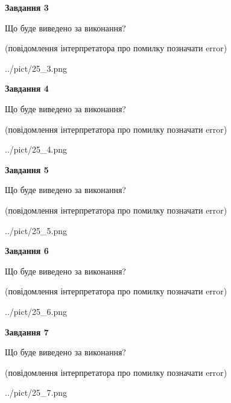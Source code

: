 \documentclass[12pt, ukrainian]{article}
\begin{document}
{\begin {large}
{\begin {center}\textbf{Завдання 3}\end {center}}\par
Що буде виведено за виконання?\par
 (повідомлення інтерпретатора про помилку позначати error)\par
\begin{center}
	{../pict/25_3.png}
\end{center}
\newpage

{\begin {center}\textbf{Завдання 4}\end {center}}\par
Що буде виведено за виконання?\par
 (повідомлення інтерпретатора про помилку позначати error)\par
\begin{center}
	{../pict/25_4.png}
\end{center}
\newpage

{\begin {center}\textbf{Завдання 5}\end {center}}\par
Що буде виведено за виконання?\par
 (повідомлення інтерпретатора про помилку позначати error)\par
\begin{center}
	{../pict/25_5.png}
\end{center}
\newpage

{\begin {center}\textbf{Завдання 6}\end {center}}\par
Що буде виведено за виконання?\par
 (повідомлення інтерпретатора про помилку позначати error)\par
\begin{center}
	{../pict/25_6.png}
\end{center}
\newpage

{\begin {center}\textbf{Завдання 7}\end {center}}\par
Що буде виведено за виконання?\par
 (повідомлення інтерпретатора про помилку позначати error)\par
\begin{center}
	{../pict/25_7.png}
\end{center}
\newpage


\end{large}}
\end{document}
